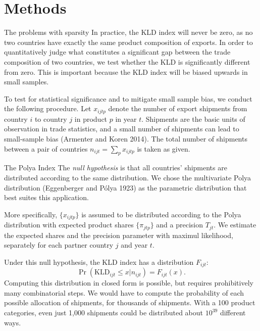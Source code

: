 \documentclass[
  ignorenonframetext,
  aspectratio=16,
]{beamer}
\begin{document}
\hypertarget{methods-1}{%
\section{Methods}\label{methods-1}}

\begin{frame}{The problems with sparsity}
\protect\hypertarget{the-problems-with-sparsity}{}
In practice, the KLD index will never be zero, as no two countries have
exactly the same product composition of exports. In order to
quantitatively judge what constitutes a significant gap between the
trade composition of two countries, we test whether the KLD is
significantly different from zero. This is important because the KLD
index will be biased upwards in small samples.

To test for statistical significance and to mitigate small sample bias,
we conduct the following procedure. Let \(x_{ijtp}\) denote the number
of export shipments from country \(i\) to country \(j\) in product \(p\)
in year \(t\). Shipments are the basic units of observation in trade
statistics, and a small number of shipments can lead to small-sample
bias (Armenter and Koren 2014). The total number of shipments between a
pair of countries \(n_{ijt} = \sum_p x_{ijtp}\) is taken as given.
\end{frame}

\begin{frame}{The Polya Index}
\protect\hypertarget{the-polya-index}{}
The \emph{null hypothesis} is that all countries' shipments are
distributed according to the same distribution. We chose the
multivariate Polya distribution (Eggenberger and Pólya 1923) as the
parametric distribution that best suites this application.

More specifically, \(\{x_{ijtp}\}\) is assumed to be distributed
according to the Polya distribution with expected product shares
\(\{\pi_{jtp}\}\) and a precision \(T_{jt}\). We estimate the expected
shares and the precision parameter with maximul likelihood, separately
for each partner country \(j\) and year \(t\).

Under this null hypothesis, the KLD index has a distribution
\(F_{ijt}\): \begin{equation}
    \Pr(\text{KLD}_{ijt} \le x | n_{ijt}) = F_{ijt}(x).
\end{equation} Computing this distribution in closed form is possible,
but requires prohibitively many combinatorial steps. We would have to
compute the probability of each possible allocation of shipments, for
thousands of shipments. With a 100 product categories, even just 1,000
shipments could be distributed about \(10^{39}\) different ways.
\end{frame}
\end{document}

